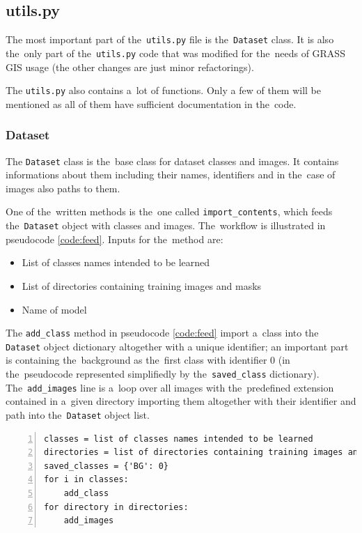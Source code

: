 \subsection{utils.py}
\label{utils}

The most important part of the~\verb|utils.py| file is the~\verb|Dataset| class. 
It is also the~only part of the~\verb|utils.py| code that was modified for
the~needs of GRASS GIS usage (the other changes are just minor refactorings).

The \verb|utils.py| also contains a~lot of functions. Only a few of them will be 
mentioned as all of them have sufficient documentation in the~code.

\subsubsection{Dataset}
\label{dataset}

The \verb|Dataset| class is the~base class for dataset classes and images. It 
contains informations about them including their names, identifiers and in
the~case of images also paths to them.

One of the~written methods is the~one called \verb|import_contents|, which feeds 
the~\verb|Dataset| object with classes and images. The~workflow is illustrated 
in pseudocode \ref{code:feed}. Inputs for the~method are:
\begin{itemize}
	\item List of classes names intended to be learned
	\item List of directories containing training images and masks
	\item Name of model
\end{itemize}

The \verb|add_class| method in pseudocode \ref{code:feed} import a~class into 
the \verb|Dataset| object dictionary altogether with a unique identifier; an 
important part is containing the~background as the~first class with identifier 0 
(in the~pseudocode represented simplifiedly by the~\verb|saved_class| 
dictionary). The~\verb|add_images| line is a~loop over all images with
the~predefined extension contained in a~given directory importing them altogether 
with their identifier and path into the~\verb|Dataset| object list. 

{\scriptsize
\begin{lstlisting}[style=python, caption={import\_contents}, captionpos=b, 
label=code:feed, deletekeywords={and},
backgroundcolor = \color{light-gray}, numbers=left, breaklines=true]
classes = list of classes names intended to be learned
directories = list of directories containing training images and masks
saved_classes = {'BG': 0}
for i in classes:
    add_class
for directory in directories:
    add_images
\end{lstlisting}}

